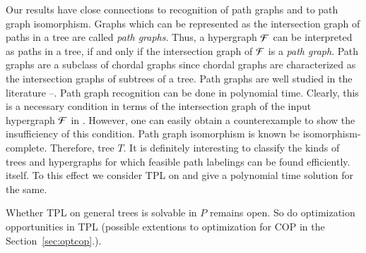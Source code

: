 \documentclass[MS,synopsis]{iitmdiss}
\begin{document}
Our results have close connections to recognition of path graphs and
to path graph isomorphism.  Graphs which can be represented as the
intersection graph of paths in a tree are called {\em path
  graphs}\cite{mcg04}. Thus, a hypergraph ${\cal F}$ can be interpreted as
paths in a tree, if and only if the intersection graph of ${\cal F}$ is a
{\em path graph}. Path graphs are a subclass of chordal graphs since
chordal graphs are characterized as the intersection graphs of
subtrees of a tree\cite{mcg04}.  Path graphs are well studied in the
literature \cite{plr70}--\cite{mcg04}.  Path graph recognition can be done in
polynomial time\cite{gav78,aas93}.  Clearly, this is a necessary
condition in terms of the intersection graph of the input hypergraph
${\cal F}$ in \FTPL. However, one can easily obtain a counterexample to
show the insufficiency of this condition.  Path graph isomorphism is known be
isomorphism-complete\cite{kklv10}. Therefore,  tree $T$.  It is
  definitely interesting to classify the kinds of trees and
  hypergraphs for which feasible path labelings can be
found efficiently.   itself.
 To this effect we consider TPL on {\kstar} and give a polynomial time
 solution for the same. 

Whether TPL on general trees is solvable in $P$ remains open. So do
optimization opportunities in TPL (possible extentions to optimization for COP in the
Section~\ref{sec:optcop}.).
\end{document}
